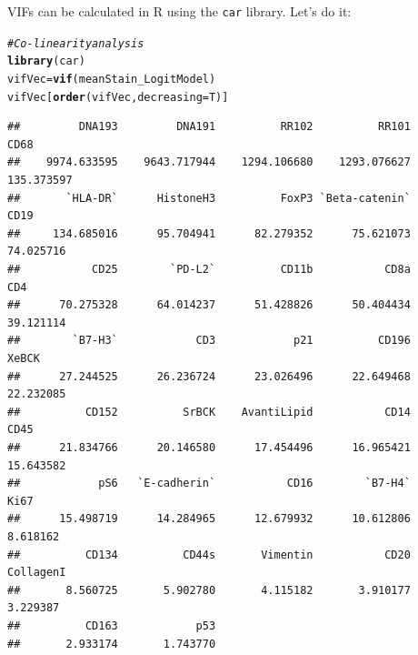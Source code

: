 \documentclass[a4paper]{article}\usepackage[]{graphicx}\usepackage[]{color}
\makeatletter
\newcommand{\hlcom}[1]{\textcolor[rgb]{0.678,0.584,0.686}{\textit{#1}}}%
\newcommand{\hlstd}[1]{\textcolor[rgb]{0.345,0.345,0.345}{#1}}%
\newcommand{\hlkwb}[1]{\textcolor[rgb]{0.69,0.353,0.396}{#1}}%
\newcommand{\hlkwc}[1]{\textcolor[rgb]{0.333,0.667,0.333}{#1}}%
\newcommand{\hlkwd}[1]{\textcolor[rgb]{0.737,0.353,0.396}{\textbf{#1}}}%
\newenvironment{kframe}{%
 \def\at@end@of@kframe{}%
 \ifinner\ifhmode%
  \def\at@end@of@kframe{\end{minipage}}%
  \begin{minipage}{\columnwidth}%
 \fi\fi%
 \def\FrameCommand##1{\hskip\@totalleftmargin \hskip-\fboxsep
 \colorbox{shadecolor}{##1}\hskip-\fboxsep
     \hskip-\linewidth \hskip-\@totalleftmargin \hskip\columnwidth}%
 \MakeFramed {\advance\hsize-\width
   \@totalleftmargin\z@ \linewidth\hsize
   \@setminipage}}%
 {\par\unskip\endMakeFramed%
 \at@end@of@kframe}
\newenvironment{knitrout}{}{} %
\makeatother
\begin{document}
VIFs can be calculated in R using the \texttt{car} library. Let's do it:
\begin{knitrout}
\color{fgcolor}\begin{kframe}
\begin{alltt}
\hlcom{# Co-linearity analysis}
\hlkwd{library}\hlstd{(car)}
\hlstd{vifVec} \hlkwb{=} \hlkwd{vif}\hlstd{(meanStain_LogitModel)}
\hlstd{vifVec[}\hlkwd{order}\hlstd{(vifVec,}\hlkwc{decreasing}\hlstd{=T)]}
\end{alltt}
\begin{verbatim}
##         DNA193         DNA191          RR102          RR101           CD68 
##    9974.633595    9643.717944    1294.106680    1293.076627     135.373597 
##       `HLA-DR`      HistoneH3          FoxP3 `Beta-catenin`           CD19 
##     134.685016      95.704941      82.279352      75.621073      74.025716 
##           CD25        `PD-L2`          CD11b           CD8a            CD4 
##      70.275328      64.014237      51.428826      50.404434      39.121114 
##        `B7-H3`            CD3            p21          CD196          XeBCK 
##      27.244525      26.236724      23.026496      22.649468      22.232085 
##          CD152          SrBCK    AvantiLipid           CD14           CD45 
##      21.834766      20.146580      17.454496      16.965421      15.643582 
##            pS6   `E-cadherin`           CD16        `B7-H4`           Ki67 
##      15.498719      14.284965      12.679932      10.612806       8.618162 
##          CD134          CD44s       Vimentin           CD20      CollagenI 
##       8.560725       5.902780       4.115182       3.910177       3.229387 
##          CD163            p53 
##       2.933174       1.743770
\end{verbatim}
\end{kframe}
\end{knitrout}
\end{document}
